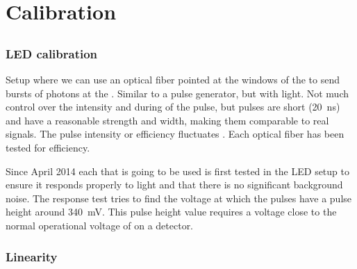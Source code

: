 \chapter{Calibration}
\label{ch:calibration}

\section{\pmt}
\label{sec:pmt}



\subsection{LED calibration}
\label{sub:led_calibration}

Setup where we can use an optical fiber pointed at the windows of the
\pmt to send bursts of photons at the \pmt. Similar to a pulse
generator, but with light. Not much control over the intensity and
during of the pulse, but pulses are short (\SI{20}{\nano\second}) and
have a reasonable strength and width, making them comparable to real
signals. The pulse intensity or efficiency fluctuates .
Each optical fiber has been tested for efficiency.

Since April 2014 each \pmt that is going to be used is first tested in
the LED setup to ensure it responds properly to light and that there is
no significant background noise. The response test tries to find the
voltage at which the pulses have a pulse height around
\SI{340}{\milli\volt}. This pulse height value requires a voltage close
to the normal operational voltage of \pmts on a \hisparc detector.


\subsection{Linearity}

